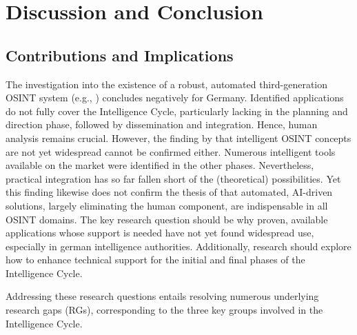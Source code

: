 \documentclass[10pt]{article}
\begin{document}
\section{Discussion and Conclusion} \label{sec:discussion}
\subsection{Contributions and Implications}

The investigation into the existence of a robust, automated third-generation OSINT system (e.g., \cite{Ghioni.2023}) concludes negatively for Germany. Identified applications do not fully cover the Intelligence Cycle, particularly lacking in the planning and direction phase, followed by dissemination and integration. Hence, human analysis remains crucial. However, the finding by \cite{PastorGalindo.2020} that intelligent OSINT
concepts are not yet widespread cannot be confirmed either. Numerous intelligent tools available
on the market were identified in the other phases. Nevertheless, practical integration has so far
fallen short of the (theoretical) possibilities. Yet this finding likewise does not confirm the
thesis of \cite{Yogish.2021} that automated, AI-driven solutions, largely eliminating
the human component, are indispensable in all OSINT domains. The key research
question should be why proven, available applications whose support is needed have not
yet found widespread use, especially in german intelligence authorities. Additionally, research should explore how to enhance technical support for the initial and final phases of the Intelligence Cycle.

Addressing these research questions entails resolving numerous underlying research gaps (RGs), corresponding to the three key groups involved in the Intelligence Cycle.
\end{document}
